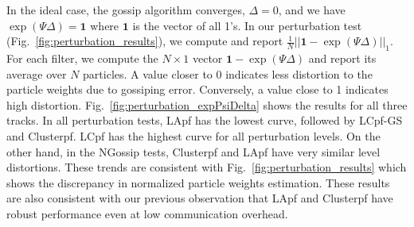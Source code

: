 \documentclass[10pt,letterpaper,final]{article}
\begin{document}
In the ideal case, the gossip algorithm converges, $\Delta = 0$, and we have $\exp(\Psi \Delta)=\textbf{1}$ where $\textbf{1}$ is the vector of all 1's. In our perturbation test (Fig.~\ref{fig:perturbation_results}), we compute and report $\frac{1}{N}||\textbf{1}-\exp(\Psi \Delta)||_1$. For each filter, we compute the $N\times 1$ vector $\textbf{1}-\exp(\Psi \Delta)$ and report its average over $N$ particles. A value closer to 0 indicates less distortion to the particle weights due to gossiping error. Conversely, a value close to 1 indicates high distortion. Fig.~\ref{fig:perturbation_expPsiDelta} shows the results for all three tracks. In all perturbation tests, LApf has the lowest curve, followed by LCpf-GS and Clusterpf. LCpf has the highest curve for all perturbation levels. On the other hand, in the NGossip tests, Clusterpf and LApf have very similar level distortions. These trends are consistent with Fig.~\ref{fig:perturbation_results} which shows the discrepancy in normalized particle weights estimation. These results are also consistent with our previous observation that LApf and Clusterpf have robust performance even at low communication overhead.
\end{document}
